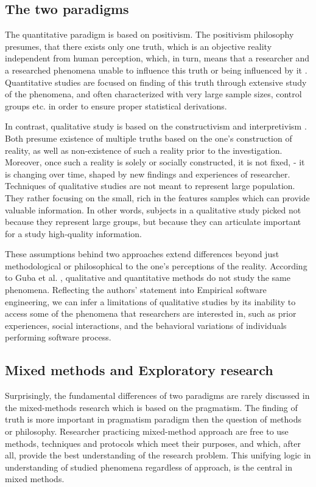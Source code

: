 \subsection{The two paradigms}
The quantitative paradigm is based on positivism. The positivism philosophy presumes, that there exists only one truth, which is an objective reality independent from human perception, which, in turn, means that a researcher and a researched phenomena unable to influence this truth or being influenced by it \cite{GubaLincoln-CompetingParadigms}. Quantitative studies are focused on finding of this truth through extensive study of the phenomena, and often characterized with very large sample sizes, control groups etc. in order to ensure proper statistical derivations.

In contrast, qualitative study is based on the constructivism \cite{citeulike:209817} \cite{GubaLincoln-CompetingParadigms} and interpretivism \cite{citeulike:447180}. Both presume existence of multiple truths based on the one's construction of reality, as well as non-existence of such a reality prior to the investigation. Moreover, once such a reality is solely or socially constructed, it is not fixed, - it is changing over time, shaped by new findings and experiences of researcher. Techniques of qualitative studies are not meant to represent large population. They rather focusing on the small, rich in the features samples which can provide valuable information. In other words, subjects in a qualitative study picked not because they represent large groups, but because they can articulate important for a study high-quality information.

These assumptions behind two approaches extend differences beyond just methodological or philosophical to the one's perceptions of the reality. According to Guba et al. \cite{GubaLincoln-CompetingParadigms}, qualitative and quantitative methods do not study the same phenomena. Reflecting the authors' statement into Empirical software engineering, we can infer a limitations of qualitative studies by its inability to access some of the phenomena that researchers are interested in, such as prior experiences, social interactions, and the behavioral variations of individuals performing software process.  

\subsection{Mixed methods and Exploratory research}
Surprisingly, the fundamental differences of two paradigms are rarely discussed in the mixed-methods research which is based on the pragmatism. The finding of truth is more important in pragmatism paradigm then the question of methods or philosophy. Researcher practicing mixed-method approach are free to use methods, techniques and protocols which meet their purposes, and which, after all, provide the best understanding of the research problem. This unifying logic in understanding of studied phenomena regardless of approach, is the central in mixed methods.

